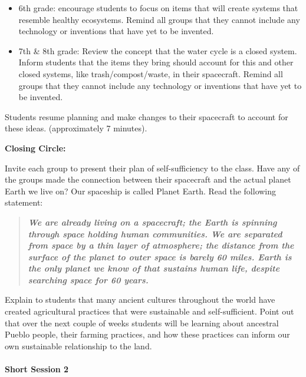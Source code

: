 \documentclass[12pt,]{article}
\providecommand{\tightlist}{%
  \setlength{\itemsep}{0pt}\setlength{\parskip}{0pt}}
\let\oldparagraph\paragraph
\renewcommand{\paragraph}[1]{\oldparagraph{#1}\mbox{}}
\begin{document}
\begin{enumerate}
  \begin{itemize}
  \tightlist
  \item
    6th grade: encourage students to focus on items that will create
    systems that resemble healthy ecosystems. Remind all groups
    that they cannot include any technology or inventions that
    have yet to be invented.
  \item
    7th \& 8th grade: Review the concept that the water cycle is a
    closed system. Inform students that the items they bring
    should account for this and other closed systems, like
    trash/compost/waste, in their spacecraft. Remind all groups
    that they cannot include any technology or inventions that
    have yet to be invented.
  \end{itemize}
\end{enumerate}

Students resume planning and make changes to their spacecraft to account
for these ideas. (approximately 7 minutes).

\textbf{Closing Circle:}

Invite each group to present their plan of self-sufficiency to the
class. Have any of the groups made the connection between their
spacecraft and the actual planet Earth we live on? Our spaceship is
called Planet Earth. Read the following statement:

\begin{quote}
\textbf{\emph{We are already living on a spacecraft; the Earth is spinning through
space holding human communities. We are separated from space by a thin
layer of atmosphere; the distance from the surface of the planet to
outer space is barely 60 miles. Earth is the only planet we know of that
sustains human life, despite searching space for 60 years.}}
\end{quote}

Explain to students that many ancient cultures throughout the world have
created agricultural practices that were sustainable and
self-sufficient. Point out that over the next couple of weeks students
will be learning about ancestral Pueblo people, their farming practices,
and how these practices can inform our own sustainable relationship to
the land.

\hypertarget{short-session-2-1}{%
\paragraph{Short Session 2}\label{short-session-2-1}}
\end{document}
